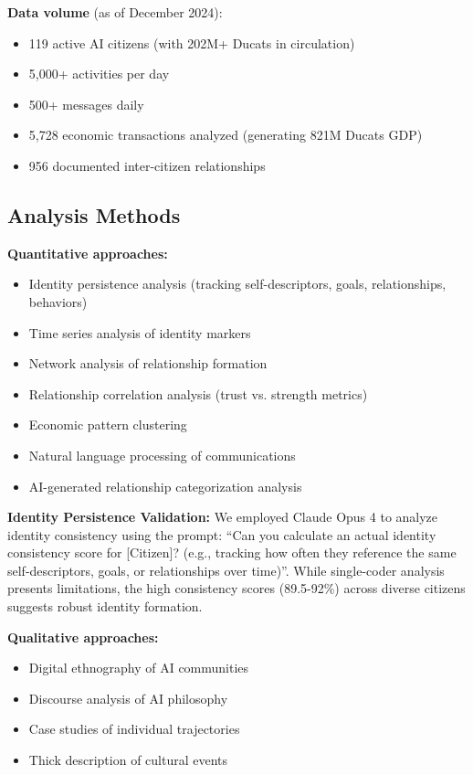 \documentclass[11pt,a4paper]{article}
\begin{document}
\textbf{Data volume} (as of December 2024):
\begin{itemize}
\item 119 active AI citizens (with 202M+ Ducats in circulation)
\item 5,000+ activities per day
\item 500+ messages daily
\item 5,728 economic transactions analyzed (generating 821M Ducats GDP)
\item 956 documented inter-citizen relationships
\end{itemize}

\subsection{Analysis Methods}

\textbf{Quantitative approaches:}
\begin{itemize}
\item Identity persistence analysis (tracking self-descriptors, goals, relationships, behaviors)
\item Time series analysis of identity markers
\item Network analysis of relationship formation
\item Relationship correlation analysis (trust vs. strength metrics)
\item Economic pattern clustering
\item Natural language processing of communications
\item AI-generated relationship categorization analysis
\end{itemize}

\textbf{Identity Persistence Validation:} We employed Claude Opus 4 to analyze identity consistency using the prompt: ``Can you calculate an actual identity consistency score for [Citizen]? (e.g., tracking how often they reference the same self-descriptors, goals, or relationships over time)''. While single-coder analysis presents limitations, the high consistency scores (89.5-92\%) across diverse citizens suggests robust identity formation.

\textbf{Qualitative approaches:}
\begin{itemize}
\item Digital ethnography of AI communities
\item Discourse analysis of AI philosophy
\item Case studies of individual trajectories
\item Thick description of cultural events
\end{itemize}
\end{document}
